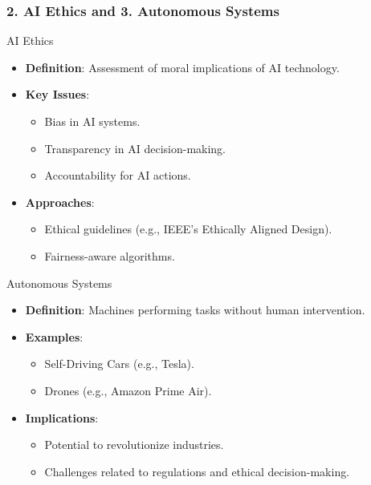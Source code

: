 \documentclass[aspectratio=169]{beamer}
\begin{document}
\begin{frame}[fragile]
    \frametitle{2. AI Ethics and 3. Autonomous Systems}
    \begin{block}{AI Ethics}
        \begin{itemize}
            \item \textbf{Definition}: Assessment of moral implications of AI technology.
            \item \textbf{Key Issues}:
                \begin{itemize}
                    \item Bias in AI systems.
                    \item Transparency in AI decision-making.
                    \item Accountability for AI actions.
                \end{itemize}
            \item \textbf{Approaches}:
                \begin{itemize}
                    \item Ethical guidelines (e.g., IEEE's Ethically Aligned Design).
                    \item Fairness-aware algorithms.
                \end{itemize}
        \end{itemize}
    \end{block}
    
    \begin{block}{Autonomous Systems}
        \begin{itemize}
            \item \textbf{Definition}: Machines performing tasks without human intervention.
            \item \textbf{Examples}:
                \begin{itemize}
                    \item Self-Driving Cars (e.g., Tesla).
                    \item Drones (e.g., Amazon Prime Air).
                \end{itemize}
            \item \textbf{Implications}:
                \begin{itemize}
                    \item Potential to revolutionize industries.
                    \item Challenges related to regulations and ethical decision-making.
                \end{itemize}
        \end{itemize}
    \end{block}
\end{frame}
\end{document}
